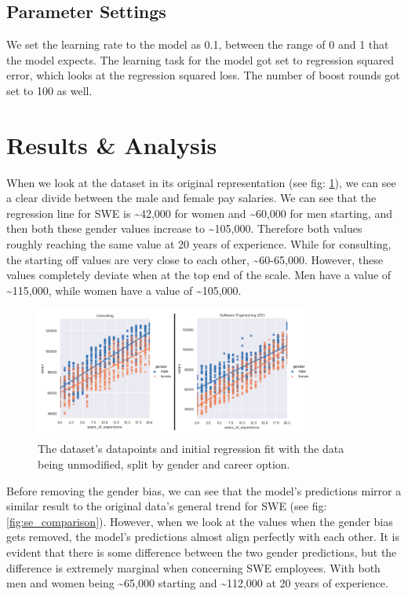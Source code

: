 \documentclass{sigchi}
\begin{document}

\subsection{Parameter Settings}
	We set the learning rate to the model as 0.1, between the range of 0 and 1 that the model expects. The learning task for the model got set to regression squared error, which looks at the regression squared loss. The number of boost rounds got set to 100 as well.

\section{Results \& Analysis}
	
	When we look at the dataset in its original representation (see fig: \ref{fig:original_data}), we can see a clear divide between the male and female pay salaries. We can see that the regression line for SWE is \textasciitilde{42,000} for women and \textasciitilde{60,000} for men starting, and then both these gender values increase to \textasciitilde{105,000}. Therefore both values roughly reaching the same value at 20 years of experience. While for consulting, the starting off values are very close to each other, \textasciitilde{60-65,000}. However, these values completely deviate when at the top end of the scale. Men have a value of \textasciitilde{115,000}, while women have a value of \textasciitilde{105,000}.

	\begin{figure}[h]
		\includegraphics[width=9.2cm]{original_data.png}
		\caption{The dataset's datapoints and initial regression fit with the data being unmodified, split by gender and career option.}
		\label{fig:original_data}
		\centering
	\end{figure}

	Before removing the gender bias, we can see that the model's predictions mirror a similar result to the original data's general trend for SWE (see fig: \ref{fig:se_comparison}).  However, when we look at the values when the gender bias gets removed, the model's predictions almost align perfectly with each other. It is evident that there is some difference between the two gender predictions, but the difference is extremely marginal when concerning SWE employees. With both men and women being \textasciitilde{65,000} starting and \textasciitilde{112,000} at 20 years of experience.
	
\end{document}
